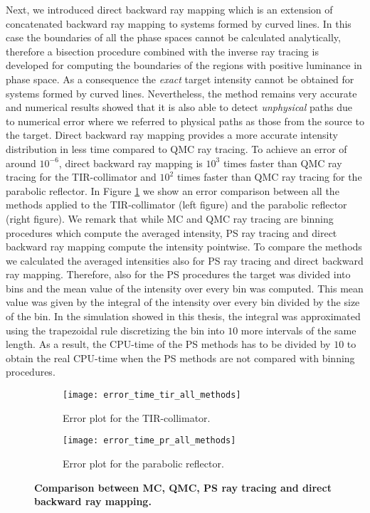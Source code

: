 Next, we introduced direct backward ray mapping which is an extension of concatenated backward ray mapping to systems formed by curved lines. In this case the boundaries of all the phase spaces cannot be calculated analytically, therefore a bisection procedure combined with the inverse ray tracing is developed for computing the boundaries of the regions with positive luminance in phase space. As a consequence the \textit{exact} target intensity cannot be obtained for systems formed by curved lines. Nevertheless, the method remains very accurate and numerical results showed that it is also able to detect \textit{unphysical} paths due to numerical error where we referred to physical paths as those from the source to the target. Direct backward ray mapping provides a more accurate intensity distribution in less time compared to QMC ray tracing. To achieve an error of around $10^{-6}$, direct backward ray mapping is $10^3$ times faster than QMC ray tracing for the TIR-collimator and $10^2$ times faster than QMC ray tracing for the parabolic reflector. In Figure \ref{fig:error_comparison} we show an error comparison between all the methods applied to the TIR-collimator (left figure) and the parabolic reflector (right figure). 
We remark that while MC and QMC ray tracing are binning procedures which compute the averaged intensity, PS ray tracing and direct backward ray mapping compute the intensity pointwise. To compare the methods we calculated the averaged intensities also for PS ray tracing and direct backward ray mapping. Therefore, also for the PS procedures the target was divided into bins and the mean value of the intensity over every bin was computed. This mean value was given by the integral of the intensity over every bin divided by the size of the bin. In the simulation showed in this thesis, the integral was approximated using the trapezoidal rule discretizing the bin into $10$ more intervals of the same length. As a result, the CPU-time of the PS methods has to be divided by $10$ to obtain the real CPU-time when the PS methods are not compared with binning procedures.
\begin{figure}[h]
\label{fig:error_comparison}
 \begin{subfigure}[t]{0.49\textwidth}
\centering
    \texttt{[image: error\_time\_tir\_all\_methods]}
    \caption{Error plot for the TIR-collimator.}
\end{subfigure}
\hfill
\begin{subfigure}[t]{0.49\textwidth}
\centering
    \texttt{[image: error\_time\_pr\_all\_methods]}
    \caption{Error plot for the parabolic reflector.}
\end{subfigure}
\caption{\textbf{Comparison between MC, QMC, PS ray tracing and direct backward ray mapping.}}
\label{fig:error_comparison}
\end{figure}
